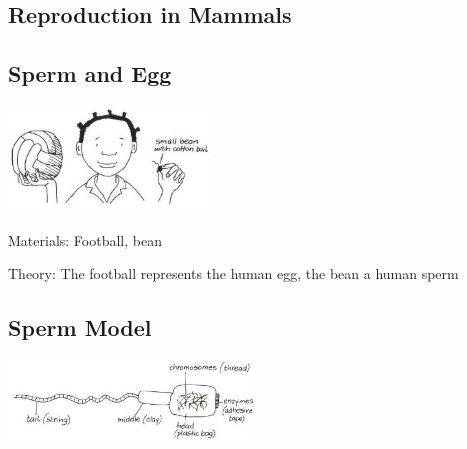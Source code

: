 \begin{multicols}{2}

\section*{Reproduction in Mammals}


\subsection{Sperm and Egg} %

\begin{center}
\includegraphics[width=0.4\textwidth]{./img/vso/sperm-egg.jpg}
\end{center}

\begin{description*}
\item[Materials:]{Football, bean}
\item[Theory:]{The football represents the
human egg, the bean a human
sperm}
\end{description*}

\columnbreak

\subsection{Sperm Model}

\begin{center}
\includegraphics[width=0.49\textwidth]{./img/vso/sperm-model.jpg}
\end{center}


\end{multicols}
